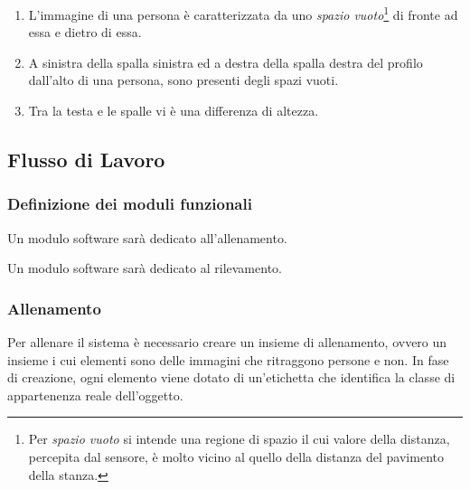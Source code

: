                 \begin{enumerate}
                    \item L'immagine di una persona è caratterizzata da uno \emph{spazio vuoto}\footnote{Per \emph{spazio vuoto} si intende una regione di spazio il cui valore della distanza, percepita dal sensore, è molto vicino al quello della distanza del pavimento della stanza.} di fronte ad essa e dietro di essa.
                    \item A sinistra della spalla sinistra ed a destra della spalla destra del profilo dall'alto di una persona, sono presenti degli spazi vuoti.
                    \item Tra la testa e le spalle vi è una differenza di altezza.
                \end{enumerate}

        \subsection{Flusso di Lavoro}
        \label{sub:overall_workflow}
            \subsubsection{Definizione dei moduli funzionali}
                Un modulo software sarà dedicato all'allenamento.

                Un modulo software sarà dedicato al rilevamento.

            \subsubsection{Allenamento}
                Per allenare il sistema è necessario creare un insieme di allenamento, ovvero un insieme i cui elementi sono delle immagini che ritraggono persone e non.
                In fase di creazione, ogni elemento viene dotato di un'etichetta che identifica la classe di appartenenza reale dell'oggetto.

